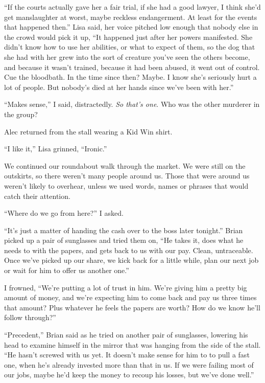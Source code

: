 ``If the courts actually gave her a fair trial, if she had a good lawyer, I think she'd get manslaughter at worst, maybe reckless endangerment.  At least for the events that happened then.'' Lisa said, her voice pitched low enough that nobody else in the crowd would pick it up, ``It happened just after her powers manifested.  She didn't know how to use her abilities, or what to expect of them, so the dog that she had with her grew into the sort of creature you've seen the others become, and because it wasn't trained, because it had been abused, it went out of control.  Cue the bloodbath.  In the time since then?  Maybe.  I know she's seriously hurt a lot of people.  But nobody's died at her hands since we've been with her.''



``Makes sense,'' I said, distractedly.  \emph{So that's one}.  Who was the other murderer in the group?



Alec returned from the stall wearing a Kid Win shirt.



``I like it,'' Lisa grinned, ``Ironic.''



We continued our roundabout walk through the market.  We were still on the outskirts, so there weren't many people around us.  Those that were around us weren't likely to overhear, unless we used words, names or phrases that would catch their attention.



``Where do we go from here?'' I asked.



``It's just a matter of handing the cash over to the boss later tonight.'' Brian picked up a pair of sunglasses and tried them on, ``He takes it, does what he needs to with the papers, and gets back to us with our pay.  Clean, untraceable.  Once we've picked up our share, we kick back for a little while, plan our next job or wait for him to offer us another one.''



I frowned, ``We're putting a lot of trust in him.  We're giving him a pretty big amount of money, and we're expecting him to come back and pay us three times that amount?  Plus whatever he feels the papers are worth?  How do we know he'll follow through?''



``Precedent,'' Brian said as he tried on another pair of sunglasses, lowering his head to examine himself in the mirror that was hanging from the side of the stall. ``He hasn't screwed with us yet.  It doesn't make sense for him to to pull a fast one, when he's already invested more than that in us.  If we were failing most of our jobs, maybe he'd keep the money to recoup his losses, but we've done well.''



